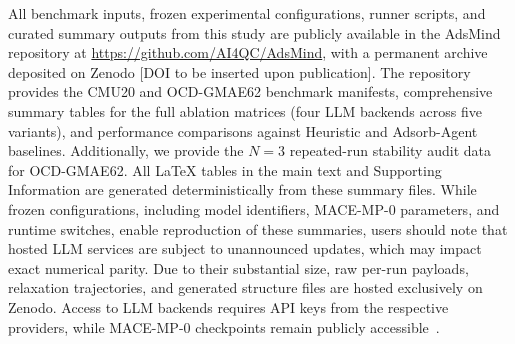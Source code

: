 All benchmark inputs, frozen experimental configurations, runner scripts, and curated summary outputs from this study are publicly available in the AdsMind repository at \url{https://github.com/AI4QC/AdsMind}, with a permanent archive deposited on Zenodo [DOI to be inserted upon publication]. The repository provides the CMU20 and OCD-GMAE62 benchmark manifests, comprehensive summary tables for the full ablation matrices (four LLM backends across five variants), and performance comparisons against Heuristic and Adsorb-Agent baselines. Additionally, we provide the $N=3$ repeated-run stability audit data for OCD-GMAE62. All LaTeX tables in the main text and Supporting Information are generated deterministically from these summary files. While frozen configurations, including model identifiers, MACE-MP-0 parameters, and runtime switches, enable reproduction of these summaries, users should note that hosted LLM services are subject to unannounced updates, which may impact exact numerical parity. Due to their substantial size, raw per-run payloads, relaxation trajectories, and generated structure files are hosted exclusively on Zenodo. Access to LLM backends requires API keys from the respective providers, while MACE-MP-0 checkpoints remain publicly accessible~\cite{batatia2023foundation}.
